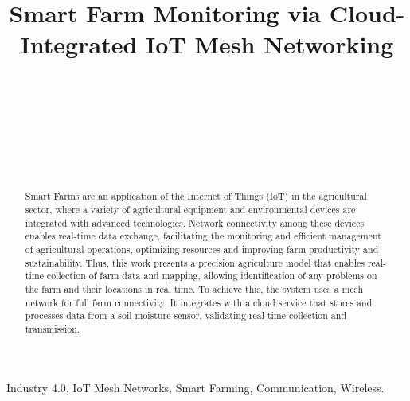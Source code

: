 \documentclass[journal]{IEEEtran}
\begin{document}
\title{Smart Farm Monitoring via Cloud-Integrated IoT Mesh Networking}

\author{
\\
\and
{}
\\
\and
{}
\\
\and
{}
\\
\and
{}
}

\maketitle

\begin{abstract}
Smart Farms are an application of the Internet of Things (IoT) in the agricultural sector, where a variety of agricultural equipment and environmental devices are integrated with advanced technologies. Network connectivity among these devices enables real-time data exchange, facilitating the monitoring and efficient management of agricultural operations, optimizing resources and improving farm productivity and sustainability. Thus, this work presents a precision agriculture model that enables real-time collection of farm data and mapping, allowing identification of any problems on the farm and their locations in real time. To achieve this, the system uses a mesh network for full farm connectivity. It integrates with a cloud service that stores and processes data from a soil moisture sensor, validating real-time collection and transmission.
\end{abstract}

\begin{IEEEkeywords}
Industry 4.0, IoT Mesh Networks, Smart Farming, Communication, Wireless.
\end{IEEEkeywords}
\end{document}
